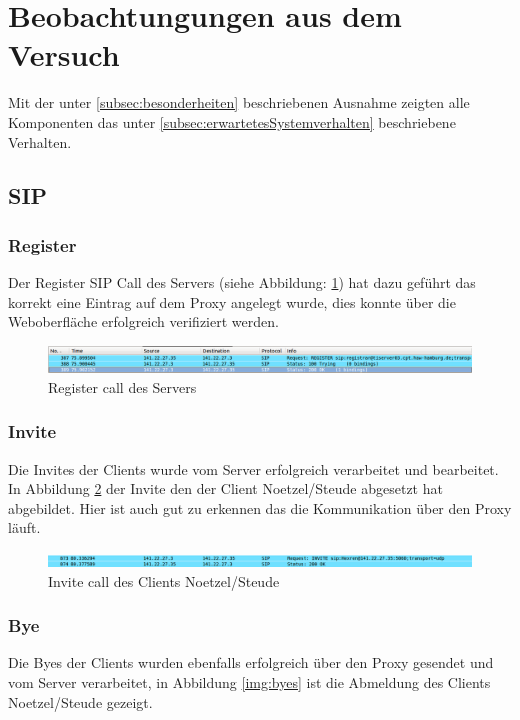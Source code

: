 \documentclass[10pt]{scrartcl}
\begin{document}
	
	
\section{Beobachtungungen aus dem Versuch} \label{sec:beobachtung}
Mit der unter \ref{subsec:besonderheiten} beschriebenen Ausnahme zeigten alle Komponenten das unter \ref{subsec:erwartetesSystemverhalten} beschriebene Verhalten.

\subsection{SIP}
	\subsubsection{Register} 
	Der Register SIP Call des Servers (siehe Abbildung: \ref{img:registerServer}) hat dazu geführt das korrekt eine Eintrag auf dem Proxy angelegt wurde, dies konnte über die Weboberfläche erfolgreich verifiziert werden.
	
	\begin{figure}[htb]
        \centering
         \includegraphics[width=\textwidth]{img/register}
         \caption{Register call des Servers}
        \label{img:registerServer}
	\end{figure}	
	
	\subsubsection{Invite}
	Die Invites der Clients wurde vom Server erfolgreich verarbeitet und bearbeitet. In Abbildung \ref{img:invites} der Invite den der Client Noetzel/Steude abgesetzt hat abgebildet. Hier ist auch gut zu erkennen das die Kommunikation über den Proxy läuft.

	\begin{figure}[htb]
        \centering
         \includegraphics[width=\textwidth]{img/invite}
         \caption{Invite call des Clients Noetzel/Steude}
        \label{img:invites}
	\end{figure}		

	\subsubsection{Bye}
	Die Byes  der Clients wurden ebenfalls erfolgreich über den Proxy gesendet und vom Server verarbeitet, in Abbildung \ref{img:byes} ist die Abmeldung des Clients Noetzel/Steude gezeigt.
	
\end{document}
